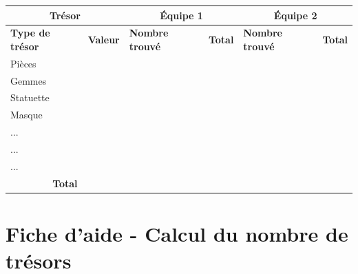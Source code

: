 \documentclass{pirategame}
\begin{document}
\begin{center}
  \begin{tabular}{|p{3cm}|p{2cm}|p{2cm}|p{2cm}|p{2cm}|p{2cm}|}
    \hline
    \multicolumn{2}{|c|}{\textbf{Trésor}} & \multicolumn{2}{c|}{\textbf{Équipe 1}} & \multicolumn{2}{c|}{\textbf{Équipe 2}} \\ \hline
    \textbf{Type de trésor} & \textbf{Valeur} & \textbf{Nombre trouvé} & \textbf{Total} & \textbf{Nombre trouvé} & \textbf{Total} \\ \hline
    Pièces                 &                 &                         &                &                         &                \\ \hline
    Gemmes                 &                 &                         &                &                         &                \\ \hline
    Statuette              &                 &                         &                &                         &                \\ \hline
    Masque                 &                 &                         &                &                         &                \\ \hline
    ...                  &                 &                         &                &                         &                \\ \hline
    ...                  &                 &                         &                &                         &                \\ \hline
    ...                  &                 &                         &                &                         &                \\ \hline
    \multicolumn{2}{|c|}{\textbf{Total}}    &                         &                &                         &                \\ \hline
  \end{tabular}
\end{center}

\newpage

\section*{Fiche d'aide - Calcul du nombre de trésors}


\end{document}
